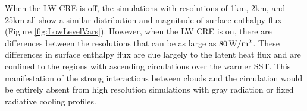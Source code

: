 \documentclass[draft]{agujournal2019}
\begin{document}
When the LW CRE is off, the simulations with resolutions of 1km, 2km, and 25km all show a similar 
distribution and magnitude of surface enthalpy flux (Figure \ref{fig:LowLevelVars}).  However, when the 
LW CRE is on, there are differences between the resolutions that can be as large as $80 \, \rm{W/
m^2}$.   These differences in surface enthalpy flux are due largely to the latent heat flux and are 
confined to the regions with ascending circulations over the warmer SST.  This manifestation of the strong interactions between clouds and the circulation 
would be entirely absent from high resolution simulations with gray radiation or fixed radiative cooling profiles.  

%
%
\end{document}

